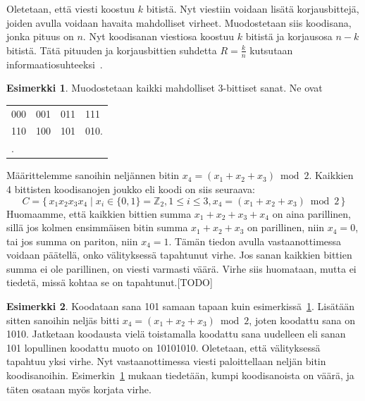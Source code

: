 \documentclass[a4paper,12pt,leqno,oneside]{report} %
\theoremstyle{plain}
\theoremstyle{plain}
\theoremstyle{definition}
\newtheorem{esimerkki}{Esimerkki}[chapter]
\theoremstyle{remark}
\numberwithin{equation}{chapter}
\newcommand*{\Zset}{\mathbb{Z}}  %
\begin{document}
    Oletetaan, että viesti koostuu $k$ bitistä. Nyt viestiin voidaan lisätä korjausbittejä, joiden avulla voidaan havaita mahdolliset virheet. Muodostetaan siis koodisana, jonka pituus on $n$. Nyt koodisanan viestiosa koostuu $k$ bitistä ja korjausosa $n-k$ bitistä. Tätä pituuden ja korjausbittien suhdetta $R = \frac{k}{n}$ kutsutaan informaatiosuhteeksi~\cite[s.~267]{GW}.
    \begin{esimerkki}\label{esim:3bitsanat}
        Muodostetaan kaikki mahdolliset 3-bittiset sanat. Ne ovat
        \begin{center}
            \begin{tabular}[t]{llll}
                000 & 001 & 011 & 111 \\
                110 & 100 & 101 & 010. \\.
            \end{tabular}
        \end{center}
        Määrittelemme sanoihin neljännen bitin
        $x_4 = (x_1 + x_2 + x_3) \bmod2$. Kaikkien 4 bittisten koodisanojen joukko eli koodi on siis seuraava:
        \[
            C = \{\, x_1x_2x_3x_4 \mid  x_i \in \{0,1\} = \Zset_2, 1 \le i \le 3, x_4 = (x_1 + x_2 + x_3) \bmod2\,\}
        \]
        Huomaamme, että kaikkien bittien summa $x_1 + x_2 + x_3 + x_4$ on aina parillinen, sillä jos kolmen ensimmäisen bitin summa $x_1 + x_2 + x_3$ on parillinen, niin $x_4 = 0$, tai jos summa on pariton, niin $x_4 = 1$.
        Tämän tiedon avulla vastaanottimessa voidaan päätellä, onko välityksessä tapahtunut virhe. Jos sanan kaikkien bittien summa ei ole parillinen, on viesti varmasti väärä. Virhe siis huomataan, mutta ei tiedetä, missä kohtaa se on tapahtunut.[TODO]
    \end{esimerkki}
    \begin{esimerkki}\label{esim:3bitsanatjatko}
        Koodataan sana 101 samaan tapaan kuin
        esimerkissä~\ref{esim:3bitsanat}. Lisätään sitten sanoihin neljäs bitti $x_4 = (x_1 + x_2 + x_3) \bmod2$, joten koodattu sana on 1010. Jatketaan koodausta vielä toistamalla koodattu sana uudelleen eli sanan 101 lopullinen koodattu muoto on 10101010. Oletetaan, että välityksessä tapahtuu yksi virhe. Nyt vastaanottimessa viesti paloittellaan neljän bitin koodisanoihin. Esimerkin~\ref{esim:3bitsanat} mukaan tiedetään, kumpi koodisanoista on väärä, ja täten osataan myös korjata virhe.
    \end{esimerkki}
\end{document}
